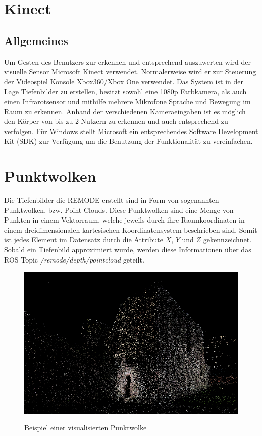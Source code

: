 \section{Kinect}
\subsection{Allgemeines}
Um Gesten des Benutzers zur erkennen und entsprechend auszuwerten wird der visuelle Sensor Microsoft Kinect verwendet. Normalerweise wird er zur Steuerung der Videospiel Konsole Xbox360/Xbox One verwendet. Das System ist in der Lage Tiefenbilder zu erstellen, besitzt sowohl eine 1080p Farbkamera, als auch einen Infrarotsensor und mithilfe mehrere Mikrofone Sprache und Bewegung im Raum zu erkennen. Anhand der verschiedenen Kameraeingaben ist es möglich den Körper von bis zu 2 Nutzern zu erkennen und auch entsprechend zu verfolgen. Für Windows stellt Microsoft ein entsprechendes Software Development Kit (SDK) zur Verfügung um die Benutzung der Funktionalität zu vereinfachen.

\section{Punktwolken}
\label{Punktwolken}
Die Tiefenbilder die REMODE erstellt sind in Form von sogenannten Punktwolken, bzw. Point Clouds. Diese Punktwolken sind eine Menge von Punkten in einem Vektorraum, welche jeweils durch ihre Raumkoordinaten in einem dreidimensionalen kartesischen Koordinatensystem beschrieben sind. Somit ist jedes Element im Datensatz durch die Attribute $X$, $Y$ und $Z$ gekennzeichnet. \cite{defPC}\cite{visPC}\ \newline
Sobald ein Tiefenbild approximiert wurde, werden diese Informationen über das ROS Topic \textit{/remode/depth/pointcloud} geteilt. \newline

\begin{figure}[ht]
	\centering
	\includegraphics[scale=0.41]{Bilder/pointcloud_1.jpg}
	\label{fig:pointcloud}
	\caption{Beispiel einer visualisierten Punktwolke \cite{visPC}}
\end{figure}

